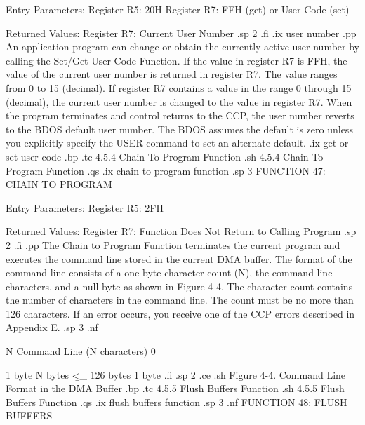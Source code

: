                  Entry Parameters:
                    Register   R5:  20H
                    Register   R7:  FFH (get)
                                       or
                                    User Code
                                      (set)

                 Returned  Values:
                    Register   R7:  Current User
                                    Number
.sp 2
.fi
.ix user number
.pp
An application program can change or obtain the currently active
user number by calling the Set/Get User Code Function.  If the 
value in register   R7 is FFH, the value of the current user number
is returned in register   R7. The value ranges from  0 to 15
(decimal). If register   R7 contains a value in the range 
0 through  15 (decimal), the current user number is changed to 
the value in register   R7. When the program terminates and 
control returns to the CCP, the user number reverts to the BDOS
default user number.  The BDOS assumes the default is zero unless
you explicitly specify the USER command to set an alternate default.
.ix get or set user code
.bp
.tc         4.5.4  Chain To Program Function
.sh
4.5.4  Chain To Program Function
.qs
.ix chain to program function
.sp 3
                 FUNCTION 47:  CHAIN TO PROGRAM

              Entry Parameters:
                 Register   R5:  2FH

              Returned  Values:
                 Register   R7:  Function Does Not
                                 Return to Calling
                                 Program
.sp 2
.fi
.pp
The Chain to Program Function terminates the current program and
executes the command line stored in the current DMA buffer. The
format of the command line consists of a one-byte character count
(N), the command line characters, and a null byte as shown in
Figure 4-4.  The character count contains the number of
characters in the command line. The count must be no more than 
126 
characters. If an error occurs, you receive one of the CCP errors
described in Appendix E.
.sp 3
.nf 
  
    N             Command Line (N characters)                0   

 1 byte              N bytes <\b_ 126 bytes                 1 byte
.fi
.sp 2
.ce
.sh 
Figure 4-4. Command Line Format in the DMA Buffer
.bp
.tc         4.5.5  Flush Buffers Function
.sh
4.5.5  Flush Buffers Function 
.qs
.ix flush buffers function
.sp 3
.nf
                   FUNCTION 48:  FLUSH BUFFERS

